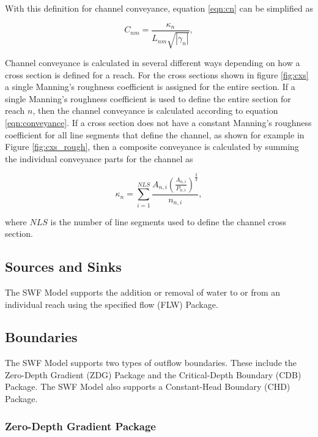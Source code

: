 \documentclass[fleqn]{article}
\begin{document}
With this definition for channel conveyance, equation \ref{eqn:cn} can be simplified as

\begin{equation}
  C_{nm} = 
  \frac{
  \kappa_n 
  }
  {
  L_{nm}
  \sqrt{| \gamma_n |}
  },
\label{eqn:cn2}
\end{equation}

Channel conveyance is calculated in several different ways depending on how a cross section is defined for a reach.  For the cross sections shown in figure \ref{fig:cxs} a single Manning's roughness coefficient is assigned for the entire section.  If a single Manning's roughness coefficient is used to define the entire section for reach $n$, then the channel conveyance is calculated according to equation \ref{eqn:conveyance}.  If a cross section does not have a constant Manning's roughness coefficient for all line segments that define the channel, as shown for example in Figure \ref{fig:cxs_rough}, then a composite conveyance is calculated by summing the individual conveyance parts for the channel as

\begin{equation}
  \kappa_n = \sum_{i=1}^{NLS} \frac{A_{n,i} \left ( \frac {A_{n,i}}{P_{n,i}}\right )^{\frac{2}{3}}}{n_{n,i}},
\end{equation}

\noindent where $NLS$ is the number of line segments used to define the channel cross section.


\subsection{Sources and Sinks}

The SWF Model supports the addition or removal of water to or from an individual reach using the specified flow (FLW) Package.  


\subsection{Boundaries}
The SWF Model supports two types of outflow boundaries.  These include the Zero-Depth Gradient (ZDG) Package and the Critical-Depth Boundary (CDB) Package.  The SWF Model also supports a Constant-Head Boundary (CHD) Package.


\subsubsection{Zero-Depth Gradient Package}
\end{document}
